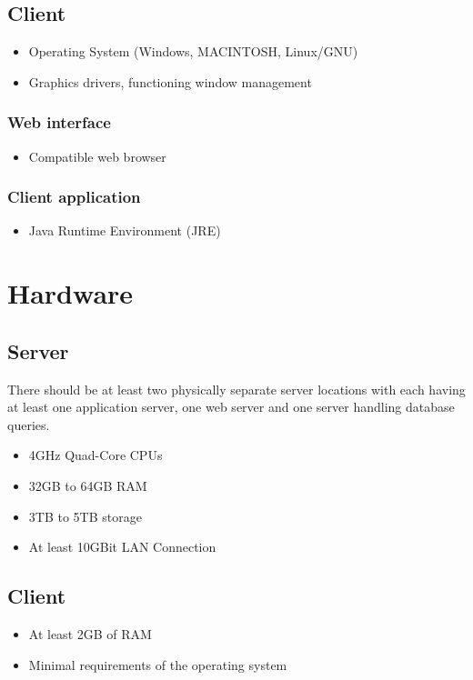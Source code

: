 \documentclass[11pt,a4paper,oneside,svgnames]{report}
\begin{document}
	\subsection{Client}
		\begin{itemize}
			\item Operating System (Windows, MACINTOSH, Linux/GNU)
			\item Graphics drivers, functioning window management
		\end{itemize}
		\subsubsection{Web interface}
			\begin{itemize}
				\item Compatible web browser
			\end{itemize}
			
		\subsubsection{Client application}
			\begin{itemize}
				\item Java Runtime Environment (JRE)
			\end{itemize}
\section{Hardware}
	\subsection{Server}
		There should be at least two physically separate server locations with each having at least one application server, one web server and one server handling database queries.
		\begin{itemize}
			\item 4GHz Quad-Core CPUs
			\item 32GB to 64GB RAM
			\item 3TB to 5TB storage
			\item At least 10GBit LAN Connection
		\end{itemize}
	\subsection{Client}
		\begin{itemize}
			\item At least 2GB of RAM
			\item Minimal requirements of the operating system
		\end{itemize}
\end{document}
